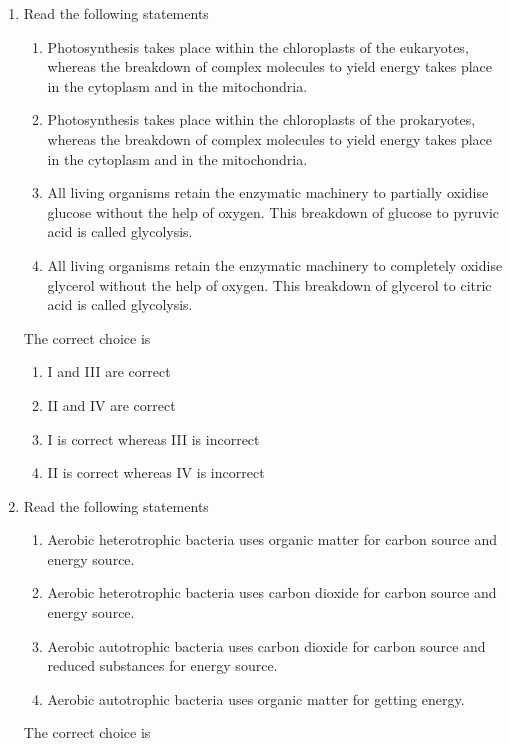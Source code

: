 \documentclass[journal,12pt,onecolumn]{IEEEtran}
\theoremstyle{remark}
\begin{document}
\begin{enumerate}
\newpage

\item Read the following statements

\begin{enumerate}[label=\Roman*.]
\item Photosynthesis takes place within the chloroplasts of the eukaryotes, whereas the breakdown of complex molecules to yield energy takes place in the cytoplasm and in the mitochondria.
\item Photosynthesis takes place within the chloroplasts of the prokaryotes, whereas the breakdown of complex molecules to yield energy takes place in the cytoplasm and in the mitochondria.
\item All living organisms retain the enzymatic machinery to partially oxidise glucose without the help of oxygen. This breakdown of glucose to pyruvic acid is called glycolysis.
\item All living organisms retain the enzymatic machinery to completely oxidise glycerol without the help of oxygen. This breakdown of glycerol to citric acid is called glycolysis.
\end{enumerate}

The correct choice is

\begin{enumerate}
\item I and III are correct
\item II and IV are correct
\item I is correct whereas III is incorrect
\item II is correct whereas IV is incorrect
\end{enumerate}
\hfill{}
\item Read the following statements

\begin{enumerate}[label=\roman*.]
\item Aerobic heterotrophic bacteria uses organic matter for carbon source and energy source.
\item Aerobic heterotrophic bacteria uses carbon dioxide for carbon source and energy source.
\item Aerobic autotrophic bacteria uses carbon dioxide for carbon source and reduced substances for energy source.
\item Aerobic autotrophic bacteria uses organic matter for getting energy.
\end{enumerate}

The correct choice is


\end{enumerate}
\end{document}
